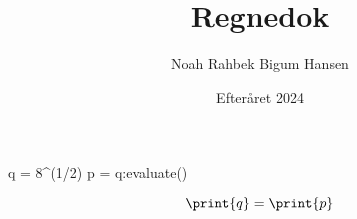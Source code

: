 \documentclass[12pt]{article}
\title{Regnedok}
\author{Noah Rahbek Bigum Hansen}
\date{Efteråret 2024}
\begin{document}
\maketitle

\begin{CAS}
q = 8^(1/2)
p = q:evaluate()
\end{CAS}


\[
  \print{q} = \print{p}
\]
\end{document}
